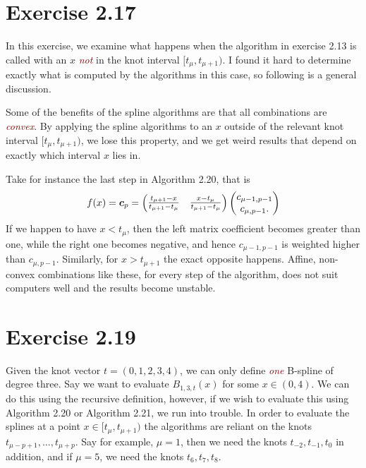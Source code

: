 \documentclass[a4paper]{article}
\let\oemph\emph
\renewcommand{\emph}[1]{\oemph{\textcolor{Maroon}{#1}}}}
\begin{document}
    \section*{Exercise 2.17}
    
    In this exercise, we examine what happens when the algorithm in exercise
    2.13 is called with an $x$ \emph{not} in the knot interval $[t_\mu,
    t_{\mu+1})$. I found it hard to determine exactly what is computed by the
    algorithms in this case, so following is a general discussion.

    Some of the benefits of the spline algorithms are that all combinations are
    \emph{convex}. By applying the spline algorithms to an $x$ outside of the
    relevant knot interval $[t_\mu, t_{\mu+1})$, we lose this property, and we
    get weird results that depend on exactly which interval $x$ lies in.

    Take for instance the last step in Algorithm 2.20, that is
    \begin{equation}
        \notag
        f(x) = \boldsymbol{c}_p = \begin{pmatrix}
            \frac{t_{\mu+1} - x}{t_{\mu + 1} - t_\mu} & \frac{x - t_\mu}{t_{\mu+1} - t_\mu}
        \end{pmatrix}
        \begin{pmatrix} 
            c_{\mu-1, p - 1}\\ c_{\mu, p-1}.
        \end{pmatrix}
    \end{equation}
    If we happen to have $x < t_\mu$, then the left matrix coefficient becomes
    greater than one, while the right one becomes negative, and hence
    $c_{\mu-1, p-1}$ is weighted higher than $c_{\mu, p-1}$. Similarly, for $x
    > t_{\mu + 1}$ the exact opposite happens. Affine, non-convex combinations
    like these, for every step of the algorithm, does not suit computers well
    and the results become unstable.
     
    \section*{Exercise 2.19}
    \label{sec:exercise_2_19}

    Given the knot vector $t = (0, 1, 2, 3, 4)$, we can only define \emph{one}
    B-spline of degree three. Say we want to evaluate $B_{1, 3, t}(x)$ for some $x
    \in (0, 4)$. We can do this using the recursive definition, however, if we
    wish to evaluate this using Algorithm 2.20 or Algorithm 2.21, we run into
    trouble. In order to evaluate the splines at a point $x \in [t_\mu,
    t_{\mu+1})$ the algorithms are reliant on the knots $t_{\mu - p + 1},
    \ldots, t_{\mu + p}$. Say for example, $\mu = 1$, then we need the knots
    $t_{-2}, t_{-1}, t_0$ in addition, and if $\mu = 5$, we need the knots
    $t_6, t_7, t_8$. 
\end{document}
